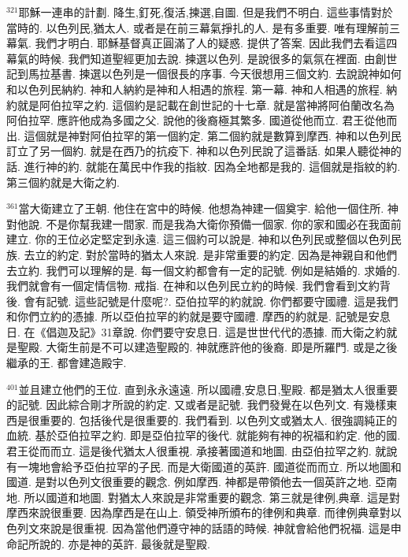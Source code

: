 \documentclass{book}
\begin{document}
$^{321}$耶穌一連串的計劃.
降生,釘死,復活,揀選,自圖.
但是我們不明白.
這些事情對於當時的.
以色列民,猶太人.
或者是在前三幕氣掙扎的人.
是有多重要.
唯有理解前三幕氣.
我們才明白.
耶穌基督真正圓滿了人的疑惑.
提供了答案.
因此我們去看這四幕氣的時候.
我們知道聖經更加去說.
揀選以色列.
是說很多的氣氛在裡面.
由創世記到馬拉基書.
揀選以色列是一個很長的序事.
今天很想用三個文約.
去說說神如何和以色列民納約.
神和人納約是神和人相遇的旅程.
第一幕.
神和人相遇的旅程.
納約就是阿伯拉罕之約.
這個約是記載在創世記的十七章.
就是當神將阿伯蘭改名為阿伯拉罕.
應許他成為多國之父.
說他的後裔極其繁多.
國道從他而立.
君王從他而出.
這個就是神對阿伯拉罕的第一個約定.
第二個約就是數算到摩西.
神和以色列民訂立了另一個約.
就是在西乃的抗疫下.
神和以色列民說了這番話.
如果人聽從神的話.
進行神的約.
就能在萬民中作我的指紋.
因為全地都是我的.
這個就是指紋的約.
第三個約就是大衛之約.

$^{361}$當大衛建立了王朝.
他住在宮中的時候.
他想為神建一個奠宇.
給他一個住所.
神對他說.
不是你幫我建一間家.
而是我為大衛你預備一個家.
你的家和國必在我面前建立.
你的王位必定堅定到永遠.
這三個約可以說是.
神和以色列民或整個以色列民族.
去立的約定.
對於當時的猶太人來說.
是非常重要的約定.
因為是神親自和他們去立約.
我們可以理解的是.
每一個文約都會有一定的記號.
例如是結婚的.
求婚的.
我們就會有一個定情信物.
戒指.
在神和以色列民立約的時候.
我們會看到文約背後.
會有記號.
這些記號是什麼呢?.
亞伯拉罕的約就說.
你們都要守國禮.
這是我們和你們立約的憑據.
所以亞伯拉罕的約就是要守國禮.
摩西的約就是.
記號是安息日.
在《倡迦及記》31章說.
你們要守安息日.
這是世世代代的憑據.
而大衛之約就是聖殿.
大衛生前是不可以建造聖殿的.
神就應許他的後裔.
即是所羅門.
或是之後繼承的王.
都會建造殿宇.

$^{401}$並且建立他們的王位.
直到永永遠遠.
所以國禮,安息日,聖殿.
都是猶太人很重要的記號.
因此綜合剛才所說的約定.
又或者是記號.
我們發覺在以色列文.
有幾樣東西是很重要的.
包括後代是很重要的.
我們看到.
以色列文或猶太人.
很強調純正的血統.
基於亞伯拉罕之約.
即是亞伯拉罕的後代.
就能夠有神的祝福和約定.
他的國.
君王從而而立.
這是後代猶太人很重視.
承接著國道和地圖.
由亞伯拉罕之約.
就說有一塊地會給予亞伯拉罕的子民.
而是大衛國道的英許.
國道從而而立.
所以地圖和國道.
是對以色列文很重要的觀念.
例如摩西.
神都是帶領他去一個英許之地.
亞南地.
所以國道和地圖.
對猶太人來說是非常重要的觀念.
第三就是律例,典章.
這是對摩西來說很重要.
因為摩西是在山上.
領受神所頒布的律例和典章.
而律例典章對以色列文來說是很重視.
因為當他們遵守神的話語的時候.
神就會給他們祝福.
這是申命記所說的.
亦是神的英許.
最後就是聖殿.
\end{document}

